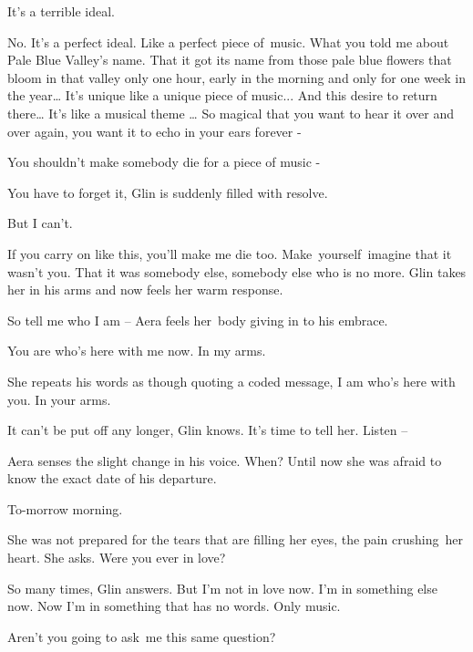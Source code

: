 \documentclass[letterpaper]{article}
\begin{document}
{\textquotedbl}It's a terrible ideal.{\textquotedbl} 

{\textquotedbl}No. It's a perfect ideal. Like a perfect piece of~music. What you told me about Pale Blue Valley's name.
That it got its name from those pale blue flowers that bloom in that valley only one hour, early in the morning and
only for one week in the year{\dots} It's unique like a unique piece of music... And this desire to return there{\dots}
It's like a musical theme {\dots} So magical that you want to hear it over and over again, you want it to echo in your
ears forever -{\textquotedbl} 

{\textquotedbl}You shouldn't make somebody die for a piece of music -{\textquotedbl} 

{\textquotedbl}You have to forget it,{\textquotedbl} Glin is suddenly filled with resolve.\ \ 

{\textquotedbl}But I can't.{\textquotedbl} 

{\textquotedbl}If you carry on like this, you'll make me die too.
Make\textcolor{red}{\ }yourself\textcolor{red}{\ }imagine that it wasn't you. That it was somebody else, somebody else
who is no more.{\textquotedbl} Glin takes her in his arms and now feels her warm response. 

{\textquotedbl}So tell me who I am -- {\textquotedbl} Aera feels her\ body giving in to his embrace.

{\textquotedbl}You are who's here with me now. In my arms.{\textquotedbl} 

She repeats his words as though quoting a coded message, {\textquotedbl}I am who's here with you. In your
arms.{\textquotedbl}

It can't be put off any longer, Glin knows. It's time to tell her. {\textquotedbl}Listen --{\textquotedbl} 

Aera senses the slight change in his voice. {\textquotedbl}When?{\textquotedbl} Until now she was afraid to know the
exact date of his departure.

{\textquotedbl}To-morrow morning.{\textquotedbl} 

She was not prepared for the tears that are filling her eyes, the pain crushing~her heart. She asks. {\textquotedbl}Were
you ever in love?{\textquotedbl} 

{\textquotedbl}So many times,{\textquotedbl} Glin answers. {\textquotedbl}But I'm not in love now. I'm in something else
now. Now I'm in something that has no words. Only music.{\textquotedbl} ~

{\textquotedbl}Aren't you going to ask~me this same question?{\textquotedbl} 
\end{document}
